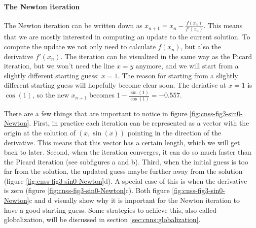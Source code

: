 \paragraph{The Newton iteration}

The Newton iteration can be written down as $x_{n+1} = x_n - \frac{f(x_n)}{f'(x_n)}$. This means  
that we are mostly interested in computing an update to the current solution. To compute the 
update we not only need to calculate $f(x_n)$, but also the derivative $f'(x_n)$. The iteration 
can be visualized in the same way as the Picard iteration, but we won't need the line $x=y$ 
anymore, and we will start from a slightly different starting guess: $x=1$. The reason for
starting from a slightly different starting guess will hopefully become clear soon. The 
deriative at $x=1$ is $\cos(1)$, so the new $x_{n+1}$ becomes $1-\frac{\sin(1)}{\cos(1)}=-0.557$. 

There are a few things that are important to notice in figure \ref{fig:cnss-fig3-sin0-Newton}. 
First, in practice each iteration can be represented as a vector with
the origin at the solution of $(x,\sin(x))$ pointing in the direction of the derivative. This 
means that this vector has a certain length, which we will get back to later.
Second, when the iteration converges, it can do so much faster than the Picard 
iteration (see subfigures a and b). Third, when the initial guess
is too far from the solution, the updated guess maybe further away from the solution (figure 
\ref{fig:cnss-fig3-sin0-Newton}d). A special case of this is when the derivative is zero 
(figure \ref{fig:cnss-fig3-sin0-Newton}c). Both figure  \ref{fig:cnss-fig3-sin0-Newton}c and d
visually show why it is important for the Newton iteration to have a good starting guess. 
Some strategies to achieve this, also called globalization, will be discussed in section 
\ref{sec:cnns:globalization}.


